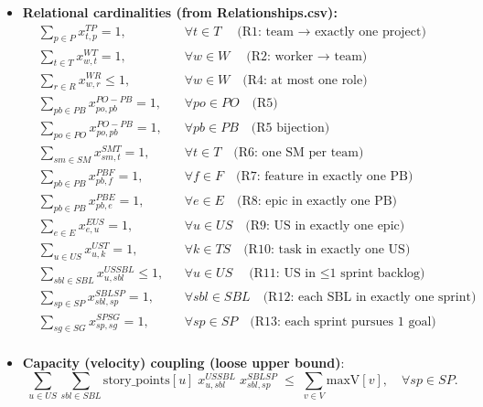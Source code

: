 \documentclass[11pt,a4paper]{article}
\begin{document}
\begin{itemize}
  \item \textbf{Relational cardinalities (from Relationships.csv):}
  \begin{align*}
    &\sum_{p\in P} x^{TP}_{t,p} = 1, && \forall t\in T \quad \text{(R1: team $\to$ exactly one project)} \\
    &\sum_{t\in T} x^{WT}_{w,t} = 1, && \forall w\in W \quad \text{(R2: worker $\to$ team)} \\
    &\sum_{r\in R} x^{WR}_{w,r} \le 1, && \forall w\in W \quad \text{(R4: at most one role)} \\
    &\sum_{pb\in PB} x^{PO\!-\!PB}_{po,pb} = 1, && \forall po\in PO \quad \text{(R5)} \\
    &\sum_{po\in PO} x^{PO\!-\!PB}_{po,pb} = 1, && \forall pb\in PB \quad \text{(R5 bijection)} \\
    &\sum_{sm\in SM} x^{SMT}_{sm,t} = 1, && \forall t\in T \quad \text{(R6: one SM per team)} \\
    &\sum_{pb\in PB} x^{PB\!F}_{pb,f} = 1, && \forall f\in F \quad \text{(R7: feature in exactly one PB)} \\
    &\sum_{pb\in PB} x^{PB\!E}_{pb,e} = 1, && \forall e\in E \quad \text{(R8: epic in exactly one PB)} \\
    &\sum_{e\in E} x^{E\!US}_{e,u} = 1, && \forall u\in US \quad \text{(R9: US in exactly one epic)} \\
    &\sum_{u\in US} x^{US\!T}_{u,k} = 1, && \forall k\in TS \quad \text{(R10: task in exactly one US)} \\
    &\sum_{sbl\in SBL} x^{US\!SBL}_{u,sbl} \le 1, && \forall u\in US \quad \text{(R11: US in $\le$1 sprint backlog)} \\
    &\sum_{sp\in SP} x^{SBL\!SP}_{sbl,sp} = 1, && \forall sbl\in SBL \quad \text{(R12: each SBL in exactly one sprint)} \\
    &\sum_{sg\in SG} x^{SP\!SG}_{sp,sg} = 1, && \forall sp\in SP \quad \text{(R13: each sprint pursues 1 goal)} \\
  \end{align*}
  \item \textbf{Capacity (velocity) coupling (loose upper bound)}:
  \[
    \sum_{u\in US}\sum_{sbl\in SBL} \text{story\_points}[u]\; x^{US\!SBL}_{u,sbl}\; x^{SBL\!SP}_{sbl,sp}
    \;\le\; \sum_{v\in V}\text{maxV}[v],\quad \forall sp\in SP.
  \]
\end{itemize}
\end{document}
